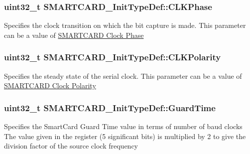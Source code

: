 \subsubsection[{\texorpdfstring{C\+L\+K\+Phase}{CLKPhase}}]{\setlength{\rightskip}{0pt plus 5cm}uint32\+\_\+t S\+M\+A\+R\+T\+C\+A\+R\+D\+\_\+\+Init\+Type\+Def\+::\+C\+L\+K\+Phase}\hypertarget{struct_s_m_a_r_t_c_a_r_d___init_type_def_aea57d654156ac6b3eff7dae2bc4d6c5d}{}\label{struct_s_m_a_r_t_c_a_r_d___init_type_def_aea57d654156ac6b3eff7dae2bc4d6c5d}
Specifies the clock transition on which the bit capture is made. This parameter can be a value of \hyperlink{group___s_m_a_r_t_c_a_r_d___clock___phase}{S\+M\+A\+R\+T\+C\+A\+RD Clock Phase} 
\subsubsection[{\texorpdfstring{C\+L\+K\+Polarity}{CLKPolarity}}]{\setlength{\rightskip}{0pt plus 5cm}uint32\+\_\+t S\+M\+A\+R\+T\+C\+A\+R\+D\+\_\+\+Init\+Type\+Def\+::\+C\+L\+K\+Polarity}\hypertarget{struct_s_m_a_r_t_c_a_r_d___init_type_def_abb3ca75bd370b08fcdf0d47c00741b0a}{}\label{struct_s_m_a_r_t_c_a_r_d___init_type_def_abb3ca75bd370b08fcdf0d47c00741b0a}
Specifies the steady state of the serial clock. This parameter can be a value of \hyperlink{group___s_m_a_r_t_c_a_r_d___clock___polarity}{S\+M\+A\+R\+T\+C\+A\+RD Clock Polarity} 
\subsubsection[{\texorpdfstring{Guard\+Time}{GuardTime}}]{\setlength{\rightskip}{0pt plus 5cm}uint32\+\_\+t S\+M\+A\+R\+T\+C\+A\+R\+D\+\_\+\+Init\+Type\+Def\+::\+Guard\+Time}\hypertarget{struct_s_m_a_r_t_c_a_r_d___init_type_def_a5bfb799c3c7ee1faed6b1eda12c79f1a}{}\label{struct_s_m_a_r_t_c_a_r_d___init_type_def_a5bfb799c3c7ee1faed6b1eda12c79f1a}
Specifies the Smart\+Card Guard Time value in terms of number of baud clocks The value given in the register (5 significant bits) is multiplied by 2 to give the division factor of the source clock frequency 

